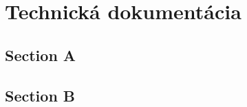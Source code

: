 \chapter{Technická dokumentácia \label{cha:technical_documentation}}

\setcounter{page}{1}

\section{Section A}

\section{Section B}

\thispagestyle{empty}
\mbox{}
\newpage